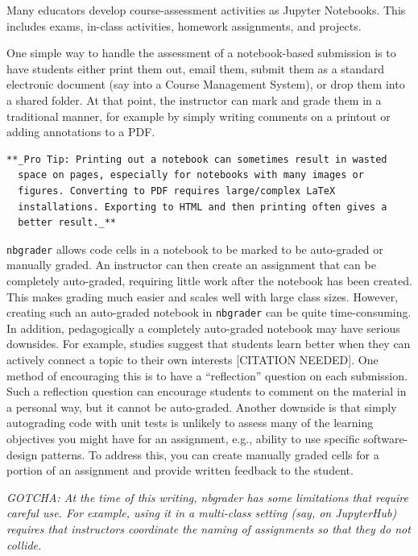 \documentclass[]{book}
\begin{document}
Many educators develop course-assessment activities as Jupyter
Notebooks. This includes exams, in-class activities, homework
assignments, and projects.

One simple way to handle the assessment of a notebook-based submission
is to have students either print them out, email them, submit them as a
standard electronic document (say into a Course Management System), or
drop them into a shared folder. At that point, the instructor can mark
and grade them in a traditional manner, for example by simply writing
comments on a printout or adding annotations to a PDF.

\begin{verbatim}
**_Pro Tip: Printing out a notebook can sometimes result in wasted
  space on pages, especially for notebooks with many images or
  figures. Converting to PDF requires large/complex LaTeX
  installations. Exporting to HTML and then printing often gives a
  better result._**
\end{verbatim}

\texttt{nbgrader} allows code cells in a notebook to be marked to be
auto-graded or manually graded. An instructor can then create an
assignment that can be completely auto-graded, requiring little work
after the notebook has been created. This makes grading much easier and
scales well with large class sizes. However, creating such an
auto-graded notebook in \texttt{nbgrader} can be quite time-consuming.
In addition, pedagogically a completely auto-graded notebook may have
serious downsides. For example, studies suggest that students learn
better when they can actively connect a topic to their own interests
{[}CITATION NEEDED{]}. One method of encouraging this is to have a
``reflection'' question on each submission. Such a reflection question
can encourage students to comment on the material in a personal way, but
it cannot be auto-graded. Another downside is that simply autograding
code with unit tests is unlikely to assess many of the learning
objectives you might have for an assignment, e.g., ability to use
specific software-design patterns. To address this, you can create
manually graded cells for a portion of an assignment and provide written
feedback to the student.

\emph{GOTCHA: At the time of this writing, nbgrader has some limitations
that require careful use. For example, using it in a multi-class setting
(say, on JupyterHub) requires that instructors coordinate the naming of
assignments so that they do not collide.}
\end{document}
